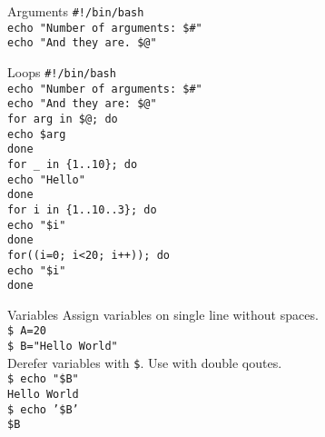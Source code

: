 \documentclass{beamer}
\let\tt\texttt
\begin{document}
\begin{frame}{Arguments}
        \tt{\#!/bin/bash}                       \\
        \tt{echo "Number of arguments: \$\#"}   \\
        \tt{echo "And they are. \$@"}           \\
\end{frame}

\begin{frame}{Loops}
        \tt{\#!/bin/bash}                       \\
        \tt{echo "Number of arguments: \$\#"}   \\
        \tt{echo "And they are: \$@"}           \\
        \tt{for arg in \$@; do}                 \\
        \quad \tt{echo \$arg}                   \\
        \tt{done}                               \\
        \tt{for \_ in \{1..10\}; do}            \\
        \quad \tt{echo "Hello"}                 \\
        \tt{done}                               \\
        \tt{for i in \{1..10..3\}; do}          \\
        \quad \tt{echo "\$i"}                   \\
        \tt{done}                               \\
        \tt{for((i=0; i<20; i++)); do}          \\
        \quad \tt{echo "\$i"}                   \\
        \tt{done}                               \\
\end{frame}

\begin{frame}{Variables}
        Assign variables on single line without spaces. \\
        \tt{\$ A=20}                                    \\
        \tt{\$ B="Hello World"}                         \\
        Derefer variables with \tt{\$}. Use with double qoutes.  \\
        \tt{\$ echo "\$B"}                              \\
        \tt{Hello World}                                \\
        \tt{\$ echo '\$B'}                              \\
        \tt{\$B}
\end{frame}
\end{document}
